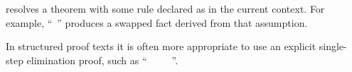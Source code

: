 \begin{isabellebody}
\begin{isamarkuptext}
\begin{descr}
  \item [\hyperlink{attribute.symmetric}{\mbox{\isa{symmetric}}}] resolves a theorem with some rule
  declared as \hyperlink{attribute.sym}{\mbox{}} in the current context.  For example,
  ``\hyperlink{command.assume}{\mbox{}}~'' produces a
  swapped fact derived from that assumption.

  In structured proof texts it is often more appropriate to use an
  explicit single-step elimination proof, such as ``\hyperlink{command.assume}{\mbox{}}~~\hyperlink{command.then}{\mbox{}}~\hyperlink{command.have}{\mbox{}}~~\hyperlink{command.ddot}{\mbox{\isa{\isacommand{{\isachardot}{\isachardot}}}}}''.

  \end{descr}%
\end{isamarkuptext}%
\isamarkuptrue%
%
\isadelimtheory
%
\endisadelimtheory
%
\isatagtheory
{}\isamarkupfalse%
%
\endisatagtheory
{\isafoldtheory}%
%
\isadelimtheory
%
\endisadelimtheory
\isanewline
\end{isabellebody}%
